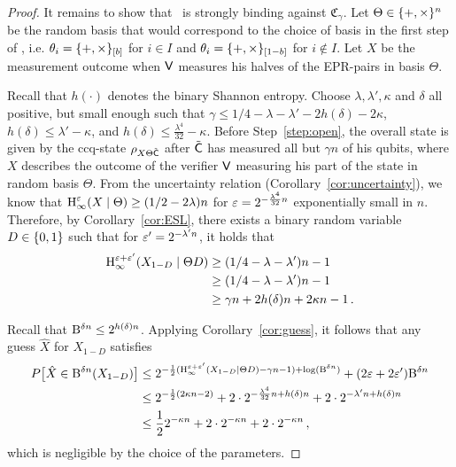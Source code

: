 \begin{proof}
  It remains to show that \eprcomm\ is strongly binding against
  $\mathfrak{C}_{\gamma}$.  Let $\Theta \in \{+,\times\}^n$ be the
  random basis that would correspond to the choice of basis in the
  first step of \comm, i.e. $\theta_i = \{+,\times\}_{[b]}$ for $i
  \in I$ and $\theta_i = \{+,\times\}_{[1-b]}$ for $i \not\in I$. Let
  $X$ be the measurement outcome when ${\sf V}$ measures his halves of the
  EPR-pairs in basis $\Theta$.
  
Recall that $h(\cdot)$ denotes the binary Shannon entropy. Choose $\lambda, \lambda', \kappa$ and $\delta$ all positive, but
  small enough such that $\gamma \leq 1/4 - \lambda - \lambda' -
  2h(\delta) - 2 \kappa$, $h(\delta) \leq \lambda'-\kappa$, and
  $h(\delta) \leq \frac{\lambda^4}{32} -
  \kappa$. Before Step~\ref{step:open}, the overall state is given by
  the ccq-state $\rho_{X \Theta \tilde{\sf C}}$ after $\tilde{\sf C}$ has measured all but
  $\gamma n$ of his qubits, where $X$ describes the outcome of the
  verifier ${\sf V}$ measuring his part of the state in random basis
  $\Theta$.  From the uncertainty relation
  (Corollary~\ref{cor:uncertainty}), we know that $\operatorname{H}_{\infty}^{\varepsilon}(X
    \mid \Theta) \geq (1/2 - 2\lambda )n$ for
  $\varepsilon=2^{-\frac{\lambda^4}{32}n}$ %
exponentially small in $n$.  Therefore, by
  Corollary~\ref{cor:ESL}, there exists a binary random variable $D
  \in \{0,1\}$ such that for $\varepsilon'=2^{-\lambda' n}$, it holds that
\begin{align*}
\operatorname{H}_{\infty}^{\varepsilon+\varepsilon'}(X_{1-D} \mid \Theta D) &\geq (1/4 - \lambda - \lambda')n -1\\ 
&\geq (1/4 -\lambda - \lambda')n -1\\
&\geq \gamma n + 2h(\delta)n + 2 \kappa n -1 \, .
\end{align*}

Recall that ${\mathrm{B}}^{\delta n} \leq 2^{h(\delta) n}$. Applying
Corollary~\ref{cor:guess}, it follows that any guess $\hat{X}$ for $X_{1-D}$
satisfies
\begin{align*}
  P\big[ \hat{X} \in {\mathrm{B}}^{\delta n}(X_{1-D}) \big] &\leq 2^{-\frac{1}{2}
    (\operatorname{H}_{\infty}^{\varepsilon+\varepsilon'}(X_{1-D}|\Theta D)-\gamma n-1) + \log({\mathrm{B}}^{\delta
      n}) } + (2 \varepsilon + 2 \varepsilon') {\mathrm{B}}^{\delta n}\\
  &\leq 2^{-\frac{1}{2} (2 \kappa n - 2)} + 2 \cdot 2^{
    -\frac{\lambda^4}{32}n + h(\delta) n } + 2 \cdot 2^{ -
    \lambda' n + h(\delta) n} \\
  &\leq \frac12 2^{-\kappa n } + 2 \cdot 2^{ -\kappa n } + 2 \cdot 2^{
    -\kappa n} \, ,
\end{align*}
which is negligible by the choice of the parameters.
\end{proof}

